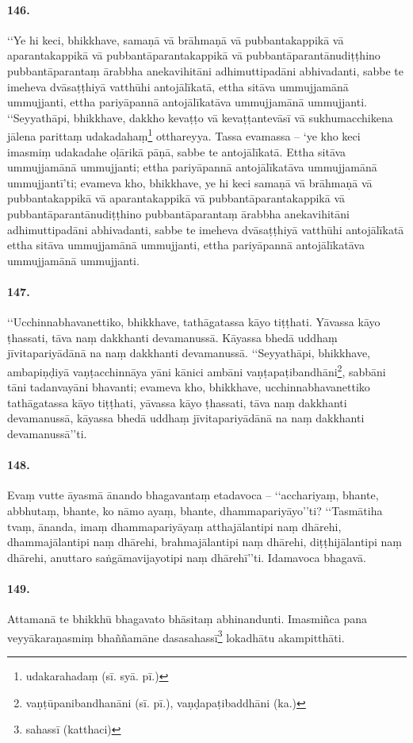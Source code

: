 \paragraph{146.}
‘‘Ye hi keci, bhikkhave, samaṇā vā brāhmaṇā vā pubbantakappikā vā aparantakappikā vā pubbantāparantakappikā vā pubbantāparantānudiṭṭhino pubbantāparantaṃ ārabbha anekavihitāni adhimuttipadāni abhivadanti, sabbe te imeheva dvāsaṭṭhiyā vatthūhi antojālīkatā, ettha sitāva ummujjamānā ummujjanti, ettha pariyāpannā antojālīkatāva ummujjamānā ummujjanti. ‘‘Seyyathāpi, bhikkhave, dakkho kevaṭṭo vā kevaṭṭantevāsī vā sukhumacchikena jālena parittaṃ udakadahaṃ\footnote{udakarahadaṃ (sī. syā. pī.)} otthareyya. Tassa evamassa – ‘ye kho keci imasmiṃ udakadahe oḷārikā pāṇā, sabbe te antojālīkatā. Ettha sitāva ummujjamānā ummujjanti; ettha pariyāpannā antojālīkatāva ummujjamānā ummujjantī’ti; evameva kho, bhikkhave, ye hi keci samaṇā vā brāhmaṇā vā pubbantakappikā vā aparantakappikā vā pubbantāparantakappikā vā pubbantāparantānudiṭṭhino pubbantāparantaṃ ārabbha anekavihitāni adhimuttipadāni abhivadanti, sabbe te imeheva dvāsaṭṭhiyā vatthūhi antojālīkatā ettha sitāva ummujjamānā ummujjanti, ettha pariyāpannā antojālīkatāva ummujjamānā ummujjanti.

\paragraph{147.}
‘‘Ucchinnabhavanettiko, bhikkhave, tathāgatassa kāyo tiṭṭhati. Yāvassa kāyo ṭhassati, tāva naṃ dakkhanti devamanussā. Kāyassa bhedā uddhaṃ jīvitapariyādānā na naṃ dakkhanti devamanussā. ‘‘Seyyathāpi, bhikkhave, ambapiṇḍiyā vaṇṭacchinnāya yāni kānici ambāni vaṇṭapaṭibandhāni\footnote{vaṇṭūpanibandhanāni (sī. pī.), vaṇḍapaṭibaddhāni (ka.)}, sabbāni tāni tadanvayāni bhavanti; evameva kho, bhikkhave, ucchinnabhavanettiko tathāgatassa kāyo tiṭṭhati, yāvassa kāyo ṭhassati, tāva naṃ dakkhanti devamanussā, kāyassa bhedā uddhaṃ jīvitapariyādānā na naṃ dakkhanti devamanussā’’ti.

\paragraph{148.}
Evaṃ vutte āyasmā ānando bhagavantaṃ etadavoca – ‘‘acchariyaṃ, bhante, abbhutaṃ, bhante, ko nāmo ayaṃ, bhante, dhammapariyāyo’’ti? ‘‘Tasmātiha tvaṃ, ānanda, imaṃ dhammapariyāyaṃ atthajālantipi naṃ dhārehi, dhammajālantipi naṃ dhārehi, brahmajālantipi naṃ dhārehi, diṭṭhijālantipi naṃ dhārehi, anuttaro saṅgāmavijayotipi naṃ dhārehī’’ti. Idamavoca bhagavā.

\paragraph{149.}
Attamanā te bhikkhū bhagavato bhāsitaṃ abhinandunti. Imasmiñca pana veyyākaraṇasmiṃ bhaññamāne dasasahassī\footnote{sahassī (katthaci)} lokadhātu akampitthāti.

